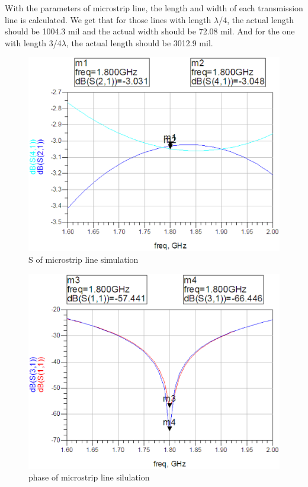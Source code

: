 \documentclass[11pt,a4paper]{report}
\begin{document}
With the parameters of microstrip line, the length and width of each transmission line is calculated. We get that for those lines with length \(\lambda\)/4, the actual length should be 1004.3 mil and the actual width should be 72.08 mil. And for the one with length 3/4\(\lambda\), the actual length should be 3012.9 mil. \\

\begin{figure}
\centering
\includegraphics[width=\textwidth]{simul1.eps}
\caption{S of microstrip line simulation}
\end{figure}

\begin{figure}
\centering
\includegraphics[width=\textwidth]{simul2.eps}
\caption{phase of microstrip line silulation}
\end{figure}
\end{document}

